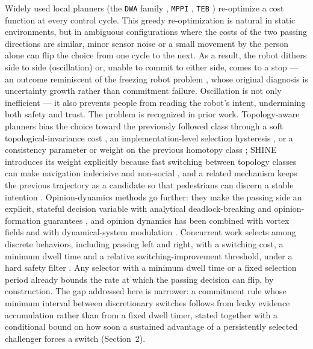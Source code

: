 \documentclass[11pt]{article}
\begin{document}
Widely used local planners (the \texttt{DWA} family \cite{fox1997dwa}, \texttt{MPPI} \cite{williams2017mppi}, \texttt{TEB} \cite{rosmann2017teb}) re-optimize a cost function at every control cycle. This greedy re-optimization is natural in static environments, but in ambiguous configurations where the costs of the two passing directions are similar, minor sensor noise or a small movement by the person alone can flip the choice from one cycle to the next. As a result, the robot dithers side to side (oscillation) or, unable to commit to either side, comes to a stop --- an outcome reminiscent of the freezing robot problem \cite{trautman2010}, whose original diagnosis is uncertainty growth rather than commitment failure. Oscillation is not only inefficient --- it also prevents people from reading the robot's intent, undermining both safety and trust. The problem is recognized in prior work. Topology-aware planners bias the choice toward the previously followed class through a soft topological-invariance cost \cite{mavrogiannis2023winding}, an implementation-level selection hysteresis \cite{rosmann2017teb}, or a consistency parameter or weight on the previous homotopy class \cite{degroot2024topology, martinezbaselga2026shine}; SHINE introduces its weight explicitly because fast switching between topology classes can make navigation indecisive and non-social \cite{martinezbaselga2026shine}, and a related mechanism keeps the previous trajectory as a candidate so that pedestrians can discern a stable intention \cite{zhou2023minimally}. Opinion-dynamics methods go further: they make the passing side an explicit, stateful decision variable with analytical deadlock-breaking and opinion-formation guarantees \cite{cathcart2023opinion}, and opinion dynamics has been combined with vortex fields \cite{daddato2024oval} and with dynamical-system modulation \cite{chen2025socialdsm}. Concurrent work selects among discrete behaviors, including passing left and right, with a switching cost, a minimum dwell time and a relative switching-improvement threshold, under a hard safety filter \cite{li2026bigcbf}. Any selector with a minimum dwell time or a fixed selection period already bounds the rate at which the passing decision can flip, by construction. The gap addressed here is narrower: a commitment rule whose minimum interval between discretionary switches follows from leaky evidence accumulation rather than from a fixed dwell timer, stated together with a conditional bound on how soon a sustained advantage of a persistently selected challenger forces a switch (Section~2).
\end{document}
